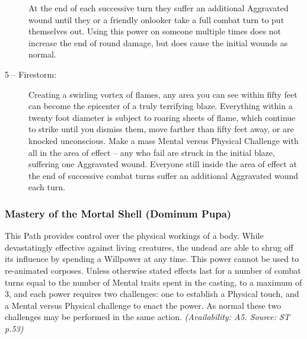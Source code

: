 \begin{description}
	At the end of each successive turn they suffer an additional Aggravated wound until they or a friendly 
	onlooker take a full combat turn to put themselves out.  Using this power on someone multiple times does 
	not increase the end of round damage, but does cause the initial wounds as normal.
	\item[5 -- Firestorm:]  Creating a swirling vortex of flames, any area you can see within fifty feet can 
	become the epicenter of a truly terrifying blaze.  Everything within a twenty foot diameter is subject to 
	roaring sheets of flame, which continue to strike until you dismiss them, move farther than fifty feet away, 
	or are knocked unconscious.  Make a mass Mental versus Physical Challenge with all in the area of effect -- 
	any who fail are struck in the initial blaze, suffering one Aggravated wound.  Everyone still inside the 
	area of effect at the end of successive combat turns suffer an additional Aggravated wound each turn.
\end{description}

\subsubsection{Mastery of the Mortal Shell (Dominum Pupa)}
This Path provides control over the physical workings of a body.  While devastatingly effective against living 
creatures, the undead are able to shrug off its influence by spending a Willpower at any time. This power 
cannot be used to re-animated corposes.   Unless otherwise stated effects last for a number of combat turns equal 
to the number of Mental traits spent in the casting, to a maximum of 3, and each power requires two challenges:  
one to establish a Physical touch, and a Mental versus Physical challenge to enact the power.  As normal these 
two challenges may be performed in the same action.  \emph{(Availability: A5.  Source: ST p.53)}

